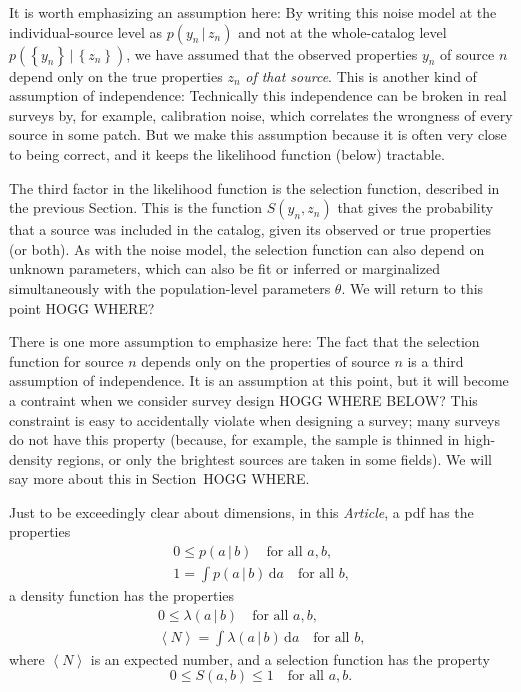 \documentclass[modern]{aastex62}
\newcommand{\dd}{\mathrm{d}}
\newcommand{\given}{\,|\,}
\newcommand{\set}[1]{\left\{{#1}\right\}}
\newcommand{\documentname}{\textsl{Article}}
\newcommand{\sectionname}{Section}
\begin{document}
It is worth emphasizing an assumption here:
By writing this noise model at the individual-source level as
$p(y_n\given z_n)$
and not at the whole-catalog level
$p(\set{y_n}\given\set{z_n})$,
we have assumed that the observed properties $y_n$ of source $n$
depend only on the true properties $z_n$ \emph{of that source}.
This is another kind of assumption of independence:
Technically this independence can be broken in real surveys by,
for example, calibration noise, which correlates the wrongness of
every source in some patch.
But we make this assumption because it is often very close to being
correct, and it keeps the likelihood function (below) tractable.

The third factor in the likelihood function is the selection function,
described in the previous \sectionname.
This is the function $S(y_n,z_n)$ that gives the probability that a
source was included in the catalog, given its observed or true
properties (or both).
As with the noise model, the selection function can also depend on
unknown parameters, which can also be fit or inferred or marginalized
simultaneously with the population-level parameters $\theta$.
We will return to this point HOGG WHERE?

There is one more assumption to emphasize here: The fact that the
selection function for source $n$ depends only on the properties of
source $n$ is a third assumption of independence.
It is an assumption at this point, but it will become a contraint
when we consider survey design HOGG WHERE BELOW?
This constraint is easy to accidentally violate when designing a
survey; many surveys do not have this property (because, for example,
the sample is thinned in high-density regions, or only the brightest
sources are taken in some fields).
We will say more about this in \sectionname~HOGG WHERE.

Just to be exceedingly clear about dimensions, in this \documentname,
a pdf has the properties
\begin{gather}
0 \leq   p(a\given b)        \quad \mbox{for all $a, b$,} \\
1 = \int p(a\given b)\,\dd a \quad \mbox{for all $b$,}
\end{gather}
a density function has the properties
\begin{gather}
             0 \leq   \lambda(a\given b)        \quad \mbox{for all $a, b$,} \\
\left<N\right> = \int \lambda(a\given b)\,\dd a \quad \mbox{for all $b$,}
\end{gather}
where $\left<N\right>$ is an expected number,
and a selection function has the property
\begin{equation}
0\leq S(a, b)\leq 1 \quad \mbox{for all $a, b$.}
\end{equation}
\end{document}
